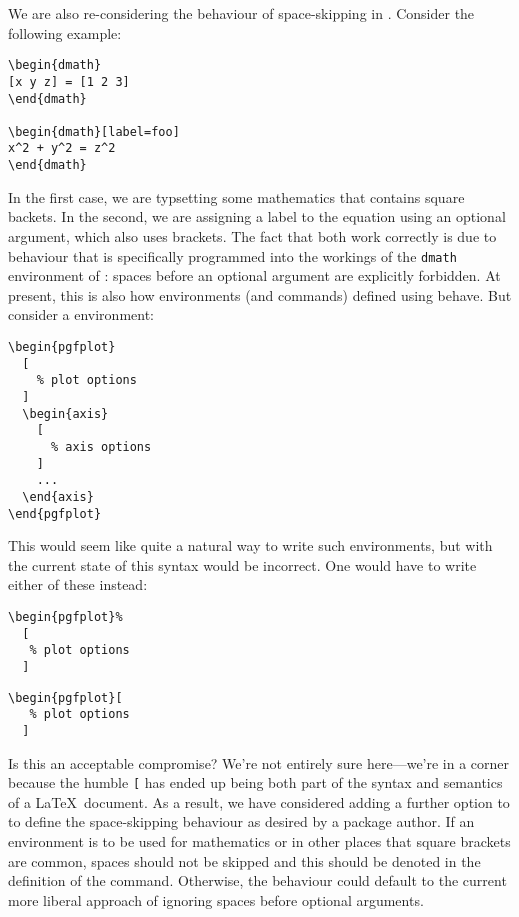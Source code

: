 \documentclass{ltnews}
\begin{document}
We are also re-considering the behaviour of space-skipping in .
Consider the following example:
\begin{multicols}{2}
\begin{verbatim}
\begin{dmath}
[x y z] = [1 2 3]
\end{dmath}

\begin{dmath}[label=foo]
x^2 + y^2 = z^2
\end{dmath}
\end{verbatim}
\end{multicols}
In the first case, we are typsetting some mathematics that contains square backets.
In the second, we are assigning a label to the equation using an optional argument, which also uses  brackets.
The fact that both work correctly is due to behaviour that is specifically programmed into the workings of the \texttt{dmath} environment of : spaces before an optional argument are explicitly forbidden.
At present, this is also how environments (and commands) defined using  behave.
But consider a  environment:
\begin{verbatim}
\begin{pgfplot}
  [
    % plot options
  ]
  \begin{axis}
    [
      % axis options
    ]
    ...
  \end{axis}
\end{pgfplot}
\end{verbatim}
This would seem like quite a natural way to write such environments, but with the current state of  this syntax would be incorrect. One would have to write either of these instead:
\begin{multicols}{2}
\begin{verbatim}
\begin{pgfplot}%
  [
   % plot options
  ]
\end{verbatim}
\begin{verbatim}
\begin{pgfplot}[
   % plot options
  ]
\end{verbatim}
\end{multicols}
Is this an acceptable compromise?
We're not entirely sure here---we're in a corner because the humble \texttt{[} has ended up being both part of the syntax and semantics of a \LaTeX\ document.
As a result, we have considered adding a further option to  to define the space-skipping behaviour as desired by a package author.
If an environment is to be used for mathematics or in other places that square brackets are common, spaces should not be skipped and this should be denoted in the definition of the command.
Otherwise, the behaviour could default to the current more liberal approach of ignoring spaces before optional arguments.
\end{document}
